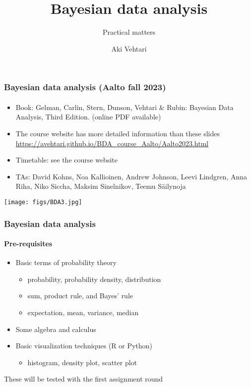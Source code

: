 \documentclass[english,t]{beamer}
\title[]{Bayesian data analysis}
\subtitle{Practical matters}
\author{Aki Vehtari}
\institute[Aalto University]{}
\begin{document}
\begin{frame}
  \frametitle{Bayesian data analysis (Aalto fall 2023)}  %
  \framesubtitle{}
  \begin{itemize}
  \item Book: Gelman, Carlin, Stern, Dunson, Vehtari \& Rubin: Bayesian Data
    Analysis, Third Edition. {\footnotesize (online PDF available)}
  \item The course website has more detailed information than these slides\\
    {\small\url{https://avehtari.github.io/BDA_course_Aalto/Aalto2023.html}}
  \item Timetable: see the course website
  \item TAs: David Kohns, Noa Kallioinen, Andrew Johnson, Leevi
    Lindgren, Anna Riha, Niko Siccha, Maksim Sinelnikov, Teemu
    Säilynoja
    \end{itemize}
    \vspace{-0.5\baselineskip}
 \begin{center}
   \texttt{[image: figs/BDA3.jpg]}
 \end{center}

\end{frame}

\begin{frame}
  \frametitle{Bayesian data analysis}  %
  \framesubtitle{Pre-requisites}
  \begin{itemize}
  \item Basic terms of probability theory
    \begin{itemize}
    \item probability, probability density, distribution
    \item sum, product rule, and Bayes' rule
    \item expectation, mean, variance, median
    \end{itemize}
  \item Some algebra and calculus
  \item Basic visualization techniques (R or Python)
    \begin{itemize}
    \item histogram, density plot, scatter plot
    \end{itemize}
  \end{itemize}

  These will be tested with the first assignment round

\end{frame}
\end{document}
